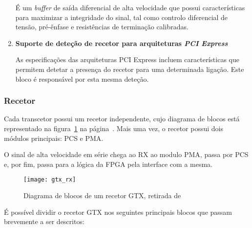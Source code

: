 \begin{enumerate}
	\hspace{1.0em}É um \textit{buffer} de saída diferencial de alta velocidade que possui características para maximizar a integridade do sinal, tal como controlo diferencial de tensão, pré-ênfase e resistências de terminação calibradas.
	
	\item \textbf{Suporte de deteção de recetor para arquiteturas \textit{PCI Express}}
	
	\hspace{1.0em}As especificações das arquiteturas PCI Express incluem características que permitem detetar a presença do recetor para uma determinada ligação. Este bloco é responsável por esta mesma deteção.	
\end{enumerate}

\subsubsection{Recetor}

Cada transcetor possui um recetor independente, cujo diagrama de blocos está representado na figura~\ref{fig:gtx_rx} na página~\pageref{fig:gtx_rx}. Mais uma vez, o recetor possui dois módulos principais: PCS e PMA. 

O sinal de alta velocidade em série chega ao RX ao modulo PMA, passa por PCS e, por fim, passa para a lógica da FPGA pela interface com a mesma.

\begin{figure}[h!]
	\begin{center}
		\leavevmode
		\texttt{[image: gtx\_rx]}
		\caption{Diagrama de blocos de um recetor GTX, retirada de \cite{R011}}
		\label{fig:gtx_rx}
	\end{center}
\end{figure}

É possível dividir o recetor GTX nos seguintes principais blocos que passam brevemente a ser descritos:

